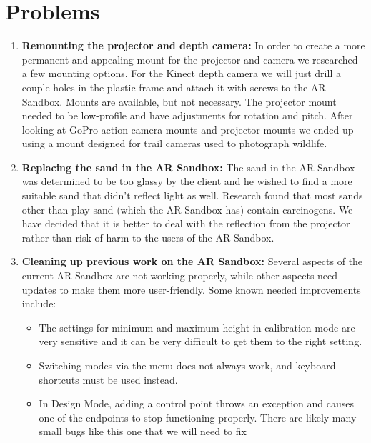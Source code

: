 \documentclass[letterpaper, 10pt, onecolumn, draftclsnofoot]{IEEEtran}
\begin{document}
\section{Problems}
    \begin{enumerate}[label=]
        \item{\textbf{Remounting the projector and depth camera:}}
            In order to create a more permanent and appealing mount for the projector and camera we researched a few mounting options. For the Kinect depth camera we will just drill a couple holes in the plastic frame and attach it with screws to the AR Sandbox. Mounts are available, but not necessary. The projector mount needed to be low-profile and have adjustments for rotation and pitch. After looking at GoPro action camera mounts and projector mounts we ended up using a mount designed for trail cameras used to photograph wildlife.
        
        \item{\textbf{Replacing the sand in the AR Sandbox:}}
            The sand in the AR Sandbox was determined to be too glassy by the client and he wished to find a more suitable sand that didn't reflect light as well. Research found that most sands other than play sand (which the AR Sandbox has) contain carcinogens. We have decided that it is better to deal with the reflection from the projector rather than risk of harm to the users of the AR Sandbox.
            
        \item{\textbf{Cleaning up previous work on the AR Sandbox:}}
            Several aspects of the current AR Sandbox are not working properly, while other aspects need updates to make them more user-friendly. Some known needed improvements include:
            \begin{itemize}
                \item{} 
                    The settings for minimum and maximum height in calibration mode are very sensitive and it can be very difficult to get them to the right setting.
                \item{} 
                    Switching modes via the menu does not always work, and keyboard shortcuts must be used instead.
                \item{} 
                    In Design Mode, adding a control point throws an exception and causes one of the endpoints to stop functioning properly. There are likely many small bugs like this one that we will need to fix
            \end{itemize}
        

\end{enumerate}
\end{document}
